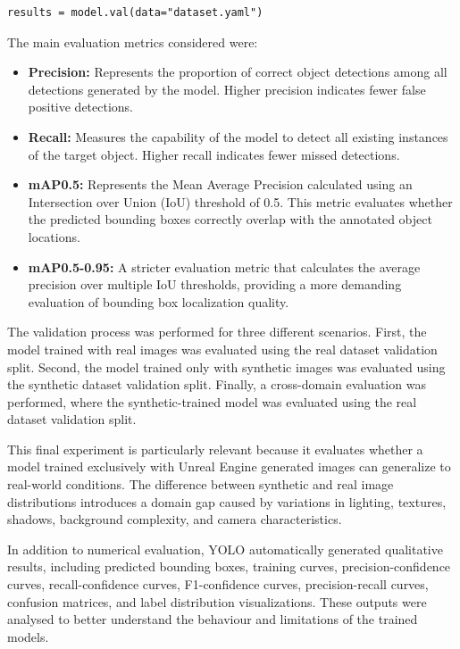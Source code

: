\documentclass[conference,a4paper]{IEEEtran}
\begin{document}
\begin{verbatim}
results = model.val(data="dataset.yaml")
\end{verbatim}

The main evaluation metrics considered were:

\begin{itemize}

    \item \textbf{Precision:} Represents the proportion of correct object detections among all detections generated by the model. Higher precision indicates fewer false positive detections.

    \item \textbf{Recall:} Measures the capability of the model to detect all existing instances of the target object. Higher recall indicates fewer missed detections.

    \item \textbf{mAP0.5:} Represents the Mean Average Precision calculated using an Intersection over Union (IoU) threshold of 0.5. This metric evaluates whether the predicted bounding boxes correctly overlap with the annotated object locations.

    \item \textbf{mAP0.5-0.95:} A stricter evaluation metric that calculates the average precision over multiple IoU thresholds, providing a more demanding evaluation of bounding box localization quality.

\end{itemize}

The validation process was performed for three different scenarios. First, the model trained with real images was evaluated using the real dataset validation split. Second, the model trained only with synthetic images was evaluated using the synthetic dataset validation split. Finally, a cross-domain evaluation was performed, where the synthetic-trained model was evaluated using the real dataset validation split.

This final experiment is particularly relevant because it evaluates whether a model trained exclusively with Unreal Engine generated images can generalize to real-world conditions. The difference between synthetic and real image distributions introduces a domain gap caused by variations in lighting, textures, shadows, background complexity, and camera characteristics.

In addition to numerical evaluation, YOLO automatically generated qualitative results, including predicted bounding boxes, training curves, precision-confidence curves, recall-confidence curves, F1-confidence curves, precision-recall curves, confusion matrices, and label distribution visualizations. These outputs were analysed to better understand the behaviour and limitations of the trained models.
\end{document}
